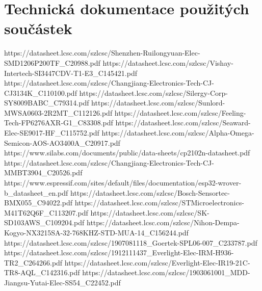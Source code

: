 \section{Technická dokumentace použitých součástek}
https://datasheet.lcsc.com/szlcsc/Shenzhen-Ruilongyuan-Elec-SMD1206P200TF_C20988.pdf            %
https://datasheet.lcsc.com/szlcsc/Vishay-Intertech-SI3447CDV-T1-E3_C145421.pdf                  %
https://datasheet.lcsc.com/szlcsc/Changjiang-Electronics-Tech-CJ-CJ3134K_C110100.pdf            %
https://datasheet.lcsc.com/szlcsc/Silergy-Corp-SY8009BABC_C79314.pdf                            %
https://datasheet.lcsc.com/szlcsc/Sunlord-MWSA0603-2R2MT_C112126.pdf                            %
https://datasheet.lcsc.com/szlcsc/Feeling-Tech-FP6276AXR-G1_C83308.pdf                          %
https://datasheet.lcsc.com/szlcsc/Seaward-Elec-SE9017-HF_C115752.pdf                            %
https://datasheet.lcsc.com/szlcsc/Alpha-Omega-Semicon-AOS-AO3400A_C20917.pdf                    %
https://www.silabs.com/documents/public/data-sheets/cp2102n-datasheet.pdf                       %
https://datasheet.lcsc.com/szlcsc/Changjiang-Electronics-Tech-CJ-MMBT3904_C20526.pdf            %
https://www.espressif.com/sites/default/files/documentation/esp32-wrover-b_datasheet_en.pdf     %
https://datasheet.lcsc.com/szlcsc/Bosch-Sensortec-BMX055_C94022.pdf                             %
https://datasheet.lcsc.com/szlcsc/STMicroelectronics-M41T62Q6F_C113207.pdf                      %
https://datasheet.lcsc.com/szlcsc/SK-SD103AWS_C109204.pdf                                       %
https://datasheet.lcsc.com/szlcsc/Nihon-Dempa-Kogyo-NX3215SA-32-768KHZ-STD-MUA-14_C156244.pdf   %
https://datasheet.lcsc.com/szlcsc/1907081118_Goertek-SPL06-007_C233787.pdf                      %
https://datasheet.lcsc.com/szlcsc/1912111437_Everlight-Elec-IRM-H936-TR2_C264266.pdf            %
https://datasheet.lcsc.com/szlcsc/Everlight-Elec-IR19-21C-TR8-AQL_C142316.pdf                   %
https://datasheet.lcsc.com/szlcsc/1903061001_MDD-Jiangsu-Yutai-Elec-SS54_C22452.pdf             %
